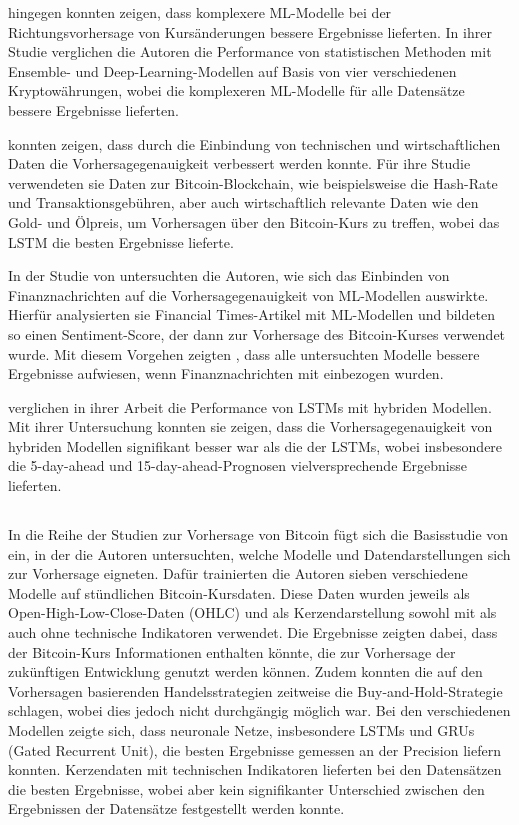 \documentclass[a4paper, 12pt]{article}
\begin{document}
\textcite{Bouteska2024} hingegen konnten zeigen, dass komplexere ML-Modelle bei der Richtungsvorhersage von Kursänderungen bessere Ergebnisse lieferten.
In ihrer Studie verglichen die Autoren die Performance von statistischen Methoden mit Ensemble- und Deep-Learning-Modellen auf Basis von vier verschiedenen Kryptowährungen, wobei die komplexeren ML-Modelle für alle Datensätze bessere Ergebnisse lieferten.

\textcite{Chen2021} konnten zeigen, dass durch die Einbindung von technischen und wirtschaftlichen Daten die Vorhersagegenauigkeit verbessert werden konnte.
Für ihre Studie verwendeten sie Daten zur Bitcoin-Blockchain, wie beispielsweise die Hash-Rate und Transaktionsgebühren, aber auch wirtschaftlich relevante Daten wie den Gold- und Ölpreis, um Vorhersagen über den Bitcoin-Kurs zu treffen, wobei das LSTM die besten Ergebnisse lieferte.

In der Studie von \textcite{Jakubik2023} untersuchten die Autoren, wie sich das Einbinden von Finanznachrichten auf die Vorhersagegenauigkeit von ML-Modellen auswirkte.
Hierfür analysierten sie Financial Times-Artikel mit ML-Modellen und bildeten so einen Sentiment-Score, der dann zur Vorhersage des Bitcoin-Kurses verwendet wurde.
Mit diesem Vorgehen zeigten \citeauthor{Jakubik2023}, dass alle untersuchten Modelle bessere Ergebnisse aufwiesen, wenn Finanznachrichten mit einbezogen wurden.

\textcite{He2024} verglichen in ihrer Arbeit die Performance von LSTMs mit hybriden Modellen.
Mit ihrer Untersuchung konnten sie zeigen, dass die Vorhersagegenauigkeit von hybriden Modellen signifikant besser war als die der LSTMs, wobei insbesondere die 5-day-ahead und 15-day-ahead-Prognosen vielversprechende Ergebnisse lieferten.

\subsection{}
In die Reihe der Studien zur Vorhersage von Bitcoin fügt sich die Basisstudie von \textcite{Goutte2023} ein, in der die Autoren untersuchten, welche Modelle und Datendarstellungen sich zur Vorhersage eigneten.
Dafür trainierten die Autoren sieben verschiedene Modelle auf stündlichen Bitcoin-Kursdaten.
Diese Daten wurden jeweils als Open-High-Low-Close-Daten (OHLC) und als Kerzendarstellung sowohl mit als auch ohne technische Indikatoren verwendet.
Die Ergebnisse zeigten dabei, dass der Bitcoin-Kurs Informationen enthalten könnte, die zur Vorhersage der zukünftigen Entwicklung genutzt werden können.
Zudem konnten die auf den Vorhersagen basierenden Handelsstrategien zeitweise die Buy-and-Hold-Strategie schlagen, wobei dies jedoch nicht durchgängig möglich war.
Bei den verschiedenen Modellen zeigte sich, dass neuronale Netze, insbesondere LSTMs und GRUs (Gated Recurrent Unit), die besten Ergebnisse gemessen an der Precision liefern konnten.
Kerzendaten mit technischen Indikatoren lieferten bei den Datensätzen die besten Ergebnisse, wobei aber kein signifikanter Unterschied zwischen den Ergebnissen der Datensätze festgestellt werden konnte.
\end{document}
